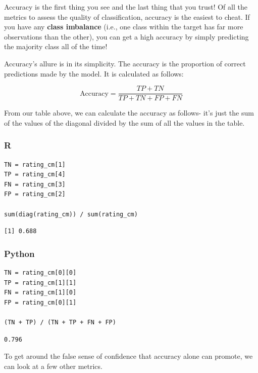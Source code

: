\documentclass[
  letterpaper,
]{krantz}
\begin{document}
Accuracy is the first thing you see and the last thing that you trust!
Of all the metrics to assess the quality of classification, accuracy is
the easiest to cheat. If you have any \textbf{class imbalance} (i.e.,
one class within the target has far more observations than the other),
you can get a high accuracy by simply predicting the majority class all
of the time!

Accuracy's allure is in its simplicity. The accuracy is the proportion
of correct predictions made by the model. It is calculated as follows:

\[\text{Accuracy} = \frac{TP + TN}{TP + TN + FP + FN}\]

From our table above, we can calculate the accuracy as follows- it's
just the sum of the values of the diagonal divided by the sum of all the
values in the table.

\subsubsection{R}

\begin{verbatim}
TN = rating_cm[1]
TP = rating_cm[4]
FN = rating_cm[3]
FP = rating_cm[2]

sum(diag(rating_cm)) / sum(rating_cm)
\end{verbatim}

\begin{verbatim}
[1] 0.688
\end{verbatim}

\subsubsection{Python}

\begin{verbatim}
TN = rating_cm[0][0]
TP = rating_cm[1][1]
FN = rating_cm[1][0]
FP = rating_cm[0][1]

(TN + TP) / (TN + TP + FN + FP)
\end{verbatim}

\begin{verbatim}
0.796
\end{verbatim}

To get around the false sense of confidence that accuracy alone can
promote, we can look at a few other metrics.
\end{document}
